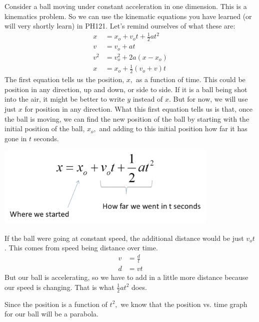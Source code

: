 \documentclass[twoside,11pt,ShortChapTitles]{BYUTextbook}
\begin{document}
Consider a ball moving under constant acceleration in one dimension. This is a
kinematics problem. So we can use the kinematic equations you have learned (or
will very shortly learn) in PH121. Let's remind ourselves of what these are: 
\begin{align*}
x  & =x_{o}+v_{o}t+\frac{1}{2}at^{2}\\
v  & =v_{o}+at\\
v^{2}  & =v_{o}^{2}+2a\left(  x-x_{o}\right) \\
x  & =x_{o}+\frac{1}{2}\left(  v_{o}+v\right)  t
\end{align*}
The first equation tells us the position, $x,$ as a function of time. This
could be position in any direction, up and down, or side to side. If it is a
ball being shot into the air, it might be better to write $y$ instead of $x.$
But for now, we will use just $x$ for position in any direction. What this
first equation tells us is that, once the ball is moving, we can find the new
position of the ball by starting with the initial position of the ball,
$x_{o},$ and adding to this initial position how far it has gone in $t$
seconds.
\begin{center}
\includegraphics[width=0.8\textwidth]{Lab7_figs/kinematicsAnnotated.png} \end{center}
If the ball were going at constant speed, the additional distance would be
just $v_{o}t$. This comes from speed being distance over time.
\begin{align*}
v  & =\frac{d}{t}\\
d  & =vt
\end{align*}
But our ball is accelerating, so we have to add in a little more distance
because our speed is changing. That is what $\frac{1}{2}at^{2}$ does. 


Since the position is a function of $t^{2},$ we know that the position vs.
time graph for our ball will be a parabola.
\end{document}
